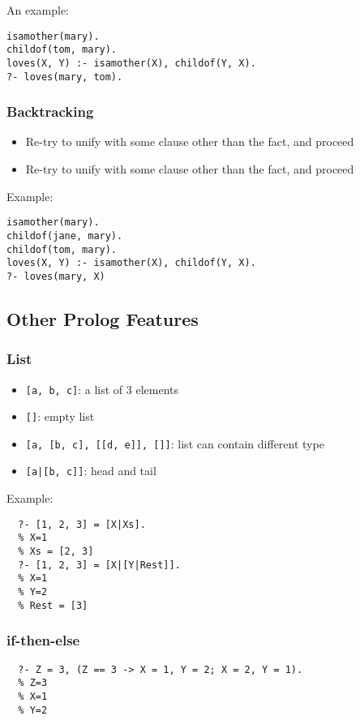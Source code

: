 An example:
\begin{lstlisting}
isamother(mary).
childof(tom, mary).
loves(X, Y) :- isamother(X), childof(Y, X).
?- loves(mary, tom).
\end{lstlisting}

\subsubsection{Backtracking}

\begin{itemize}
\item Re-try to unify with some clause other than the fact, and proceed
\item Re-try to unify with some clause other than the fact, and proceed
\end{itemize}

Example:
\begin{lstlisting}
isamother(mary).
childof(jane, mary).
childof(tom, mary).
loves(X, Y) :- isamother(X), childof(Y, X).
?- loves(mary, X)
\end{lstlisting}

\subsection{Other Prolog Features}
\subsubsection{List}

\begin{itemize}
\item \texttt{[a, b, c]}: a list of 3 elements
\item \texttt{[]}: empty list
\item \texttt{[a, [b, c], [[d, e]], []]}: list can contain different type
\item \texttt{[a|[b, c]]}: head and tail
\end{itemize}

Example:
\begin{lstlisting}
  ?- [1, 2, 3] = [X|Xs].
  % X=1
  % Xs = [2, 3]
  ?- [1, 2, 3] = [X|[Y|Rest]].
  % X=1
  % Y=2
  % Rest = [3]
\end{lstlisting}

\subsubsection{if-then-else}
\begin{lstlisting}
  ?- Z = 3, (Z == 3 -> X = 1, Y = 2; X = 2, Y = 1).
  % Z=3
  % X=1
  % Y=2
\end{lstlisting}

